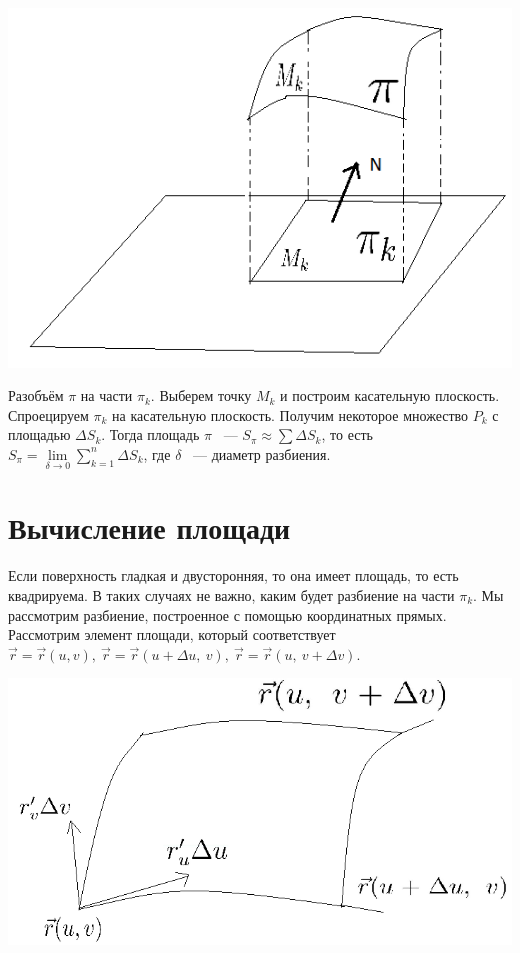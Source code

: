 \documentclass[../../main.tex]{subfiles}
\begin{document}
\begin{center}
\includegraphics[scale = 1]{lec22_1.png}
\end{center}

Разобъём $\pi$ на части $\pi_k$. Выберем точку $M_k$ и построим касательную плоскость. Спроецируем $\pi_k$ на касательную плоскость. Получим некоторое множество $P_k$ с площадью $\Delta S_k$. Тогда площадь $\pi$ ~--- $S_\pi \approx \sum\Delta S_k$, то есть $S_\pi = \lim\limits_{\delta\rightarrow0}\sum\limits_{k = 1}^n\Delta S_k$, где $\delta$ ~--- диаметр разбиения.

\section{Вычисление площади}

Если поверхность гладкая и двусторонняя, то она имеет площадь, то есть квадрируема. В таких случаях не важно, каким будет разбиение на части $\pi_k$. Мы рассмотрим разбиение, построенное с помощью координатных прямых. Рассмотрим элемент площади, который соответствует $\vec{r} = \vec{r}(u, v), \ \vec{r} = \vec{r}(u + \Delta u, \ v), \ \vec{r} = \vec{r}(u, \ v + \Delta v)$.

\begin{center}
\includegraphics[scale = 1]{lec22_2.png}
\end{center}
\end{document}
